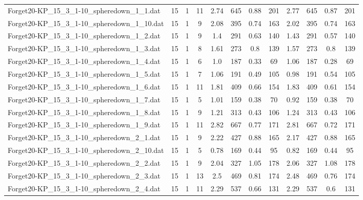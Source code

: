 \begin{sidewaystable}[!ht]
{\begin{tabular}{lccccccccccc}
Forget20-KP\_15\_3\_1-10\_spheredown\_1\_1.dat & 15 & 1 & 11 & 2.74 & 645 & 0.88 & 201 & 2.77 & 645 &  \textcolor{blue2}{0.87} & 201 \\
Forget20-KP\_15\_3\_1-10\_spheredown\_1\_10.dat & 15 & 1 & 9 & 2.08 & 395 &  \textcolor{blue2}{0.74} & 163 & 2.02 & 395 &  \textcolor{blue2}{0.74} & 163 \\
Forget20-KP\_15\_3\_1-10\_spheredown\_1\_2.dat & 15 & 1 & 9 & 1.4 & 291 & 0.63 & 140 & 1.43 & 291 &  \textcolor{blue2}{0.57} & 140 \\
Forget20-KP\_15\_3\_1-10\_spheredown\_1\_3.dat & 15 & 1 & 8 & 1.61 & 273 &  \textcolor{blue2}{0.8} & 139 & 1.57 & 273 &  \textcolor{blue2}{0.8} & 139 \\
Forget20-KP\_15\_3\_1-10\_spheredown\_1\_4.dat & 15 & 1 & 6 & 1.0 & 187 & 0.33 & 69 & 1.06 & 187 &  \textcolor{blue2}{0.28} & 69 \\
Forget20-KP\_15\_3\_1-10\_spheredown\_1\_5.dat & 15 & 1 & 7 & 1.06 & 191 &  \textcolor{blue2}{0.49} & 105 & 0.98 & 191 & 0.54 & 105 \\
Forget20-KP\_15\_3\_1-10\_spheredown\_1\_6.dat & 15 & 1 & 11 & 1.81 & 409 & 0.66 & 154 & 1.83 & 409 &  \textcolor{blue2}{0.61} & 154 \\
Forget20-KP\_15\_3\_1-10\_spheredown\_1\_7.dat & 15 & 1 & 5 & 1.01 & 159 &  \textcolor{blue2}{0.38} & 70 & 0.92 & 159 &  \textcolor{blue2}{0.38} & 70 \\
Forget20-KP\_15\_3\_1-10\_spheredown\_1\_8.dat & 15 & 1 & 9 & 1.21 & 313 &  \textcolor{blue2}{0.43} & 106 & 1.24 & 313 &  \textcolor{blue2}{0.43} & 106 \\
Forget20-KP\_15\_3\_1-10\_spheredown\_1\_9.dat & 15 & 1 & 11 & 2.82 & 667 & 0.77 & 171 & 2.81 & 667 & 0.72 & 171 \\
Forget20-KP\_15\_3\_1-10\_spheredown\_2\_1.dat & 15 & 1 & 9 & 2.22 & 427 &  \textcolor{blue2}{0.88} & 165 & 2.17 & 427 &  \textcolor{blue2}{0.88} & 165 \\
Forget20-KP\_15\_3\_1-10\_spheredown\_2\_10.dat & 15 & 1 & 5 & 0.78 & 169 &  \textcolor{blue2}{0.44} & 95 & 0.82 & 169 &  \textcolor{blue2}{0.44} & 95 \\
Forget20-KP\_15\_3\_1-10\_spheredown\_2\_2.dat & 15 & 1 & 9 & 2.04 & 327 & 1.05 & 178 & 2.06 & 327 & 1.08 & 178 \\
Forget20-KP\_15\_3\_1-10\_spheredown\_2\_3.dat & 15 & 1 & 13 & 2.5 & 469 & 0.81 & 174 & 2.48 & 469 & 0.76 & 174 \\
Forget20-KP\_15\_3\_1-10\_spheredown\_2\_4.dat & 15 & 1 & 11 & 2.29 & 537 & 0.66 & 131 & 2.29 & 537 &  \textcolor{blue2}{0.6} & 131 \\

\end{tabular}}
\end{sidewaystable}
